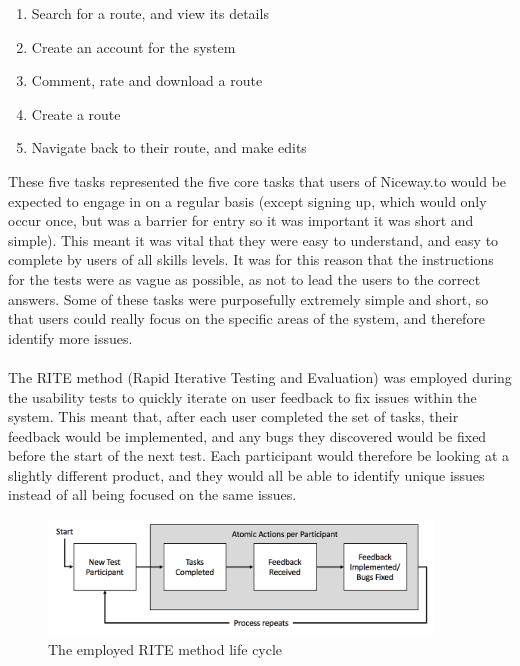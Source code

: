 \begin{enumerate}
	\item Search for a route, and view its details
	\item Create an account for the system
	\item Comment, rate and download a route 
	\item Create a route
	\item Navigate back to their route, and make edits
\end{enumerate}
\noindent 
These five tasks represented the five core tasks that users of Niceway.to would be expected to engage in on a regular basis (except signing up, which would only occur once, but was a barrier for entry so it was important it was short and simple). This meant it was vital that they were easy to understand, and easy to complete by users of all skills levels. It was for this reason that the instructions for the tests were as vague as possible, as not to lead the users to the correct answers. Some of these tasks were purposefully extremely simple and short, so that users could really focus on the specific areas of the system, and therefore identify more issues.\ \\
\ \\
The RITE method (Rapid Iterative Testing and Evaluation) was employed during the usability tests to quickly iterate on user feedback to fix issues within the system. This meant that, after each user completed the set of tasks, their feedback would be implemented, and any bugs they discovered would be fixed before the start of the next test. Each participant would therefore be looking at a slightly different product, and they would all be able to identify unique issues instead of all being focused on the same issues.

\begin{figure}[!ht]
	\begin{center}
		\includegraphics[width=0.9125\textwidth]{images/testing/rite.png}
	\end{center}
	\vspace{-6mm}
	\caption{The employed RITE method life cycle}	
	\vspace{-6mm}
\end{figure}

